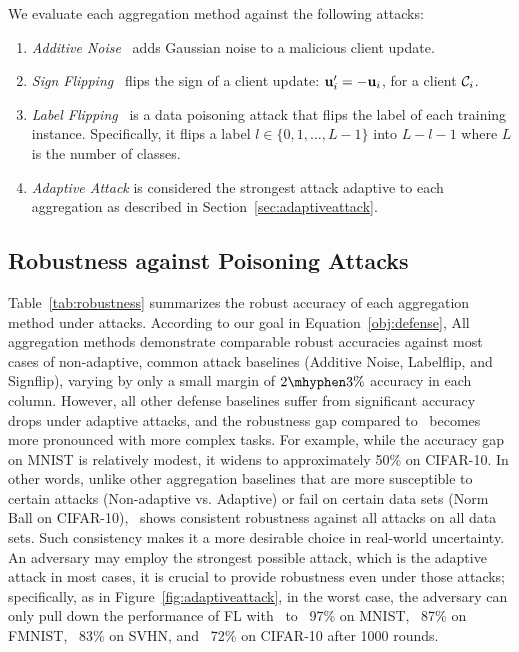 We evaluate each aggregation method against the following attacks:
\begin{enumerate}
    \item \textit{Additive Noise}~\cite{li2019additive} adds Gaussian noise to a malicious client update.
    \item \textit{Sign Flipping}~\cite{damaskinos2018signflipping} flips the sign of a client update: $\mathbf{u}'_i = - \mathbf{u}_i$, for a client $\mathcal{C}_i$.
    \item \textit{Label Flipping}~\cite{fang2020local} is a data poisoning attack that flips the label of each training instance. Specifically, it flips a label $l \in \{0, 1, \dots, L-1\}$ into $L-l-1$ where $L$ is the number of classes.
    \item \textit{Adaptive Attack} is considered the strongest attack adaptive to each aggregation as described in Section~\ref{sec:adaptiveattack}.
\end{enumerate}





\subsection{Robustness against Poisoning Attacks}
\label{sec:empirical-robustness}

Table~\ref{tab:robustness} summarizes the robust accuracy of each aggregation method under attacks.
According to our goal in Equation~\ref{obj:defense},
All aggregation methods demonstrate comparable robust accuracies against most cases of non-adaptive, common attack baselines (\ie Additive Noise, Labelflip, and Signflip), varying by only a small margin of $2 \mhyphen 3\%$ accuracy in each column.
However, all other defense baselines suffer from significant accuracy drops under adaptive attacks, and the robustness gap compared to \ours~becomes more pronounced with more complex tasks. For example, while the accuracy gap on MNIST is relatively modest, it widens to approximately 50\% on CIFAR-10.
In other words, unlike other aggregation baselines that are more susceptible to certain attacks (\eg Non-adaptive vs. Adaptive) or fail on certain data sets (\eg Norm Ball on CIFAR-10), \ours~shows consistent robustness against all attacks on all data sets.
Such consistency makes it a more desirable choice in real-world uncertainty. An adversary may employ the strongest possible attack, which is the adaptive attack in most cases, it is crucial to provide robustness even under those attacks; specifically, as in Figure~\ref{fig:adaptiveattack}, in the worst case, the adversary can only pull down the performance of FL with \ours~to ~97\% on MNIST, ~87\% on FMNIST, ~83\% on SVHN, and ~72\% on CIFAR-10 after 1000 rounds.




